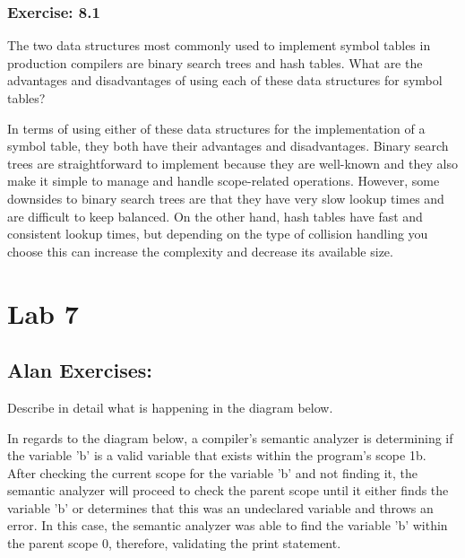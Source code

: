 \documentclass[letterpaper, 10pt,DIV=13]{scrartcl}
\numberwithin{equation}{section} %
\numberwithin{figure}{section} %
\numberwithin{table}{section} %
\begin{document}
\subsubsection*{Exercise: 8.1}
The two data structures most commonly used to implement symbol tables in production compilers are binary search trees and hash tables. What are the advantages and disadvantages of using each of these data structures for symbol tables? \newline

In terms of using either of these data structures for the implementation of a symbol table, they both have their advantages and disadvantages. Binary search trees are straightforward to implement because they are well-known and they also make it simple to manage and handle scope-related operations. However, some downsides to binary search trees are that they have very slow lookup times and are difficult to keep balanced. On the other hand, hash tables have fast and consistent lookup times, but depending on the type of collision handling you choose this can increase the complexity and decrease its available size.




\pagebreak

\section*{Lab 7}

\subsection*{Alan Exercises:}
Describe in	detail what is happening in the diagram below. \newline

In regards to the diagram below, a compiler's semantic analyzer is determining if the variable 'b' is a valid variable that exists within the program's scope 1b. After checking the current scope for the variable 'b' and not finding it, the semantic analyzer will proceed to check the parent scope until it either finds the variable 'b' or determines that this was an undeclared variable and throws an error. In this case, the semantic analyzer was able to find the variable 'b' within the parent scope 0, therefore, validating the print statement. \newline
\end{document}
